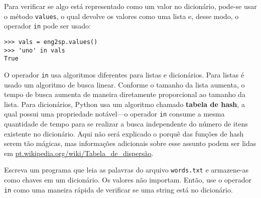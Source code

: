 Para verificar se algo está representado como um valor no dicionário, pode-se usar o método {\tt values}, o qual devolve os valores como uma lista e, desse
modo, o operador {\tt in} pode ser usado:


\beforeverb
\begin{verbatim}
>>> vals = eng2sp.values()
>>> 'uno' in vals
True
\end{verbatim}
\afterverb
%

O operador {\tt in} usa algoritmos diferentes para listas e dicionários. Para
listas é usado um algoritmo de busca linear. Conforme o tamanho da lista aumenta, o tempo de busca aumenta de maneira diretamente proporcional ao tamanho da lista.
Para dicionários, Python usa um algoritmo chamado {\bf tabela de hash}, a qual possui uma propriedade notável---o operador {\tt in} consume a mesma quantidade de tempo para se realizar a busca independente do número de itens existente no dicionário. Aqui não será explicado o porquê das funções de hash serem tão mágicas, mas informações adicionais sobre esse assunto podem ser lidas em \url{pt.wikipedia.org/wiki/Tabela_de_dispersão}.


\begin{ex}
\label{wordlist2}


Escreva um programa que leia as palavras do arquivo {\tt words.txt} e armazene-as como chaves em um dicionário. Os valores não importam. Então, use o operador {\tt in} como uma maneira rápida de verificar se uma string está no dicionário.

\end{ex}

